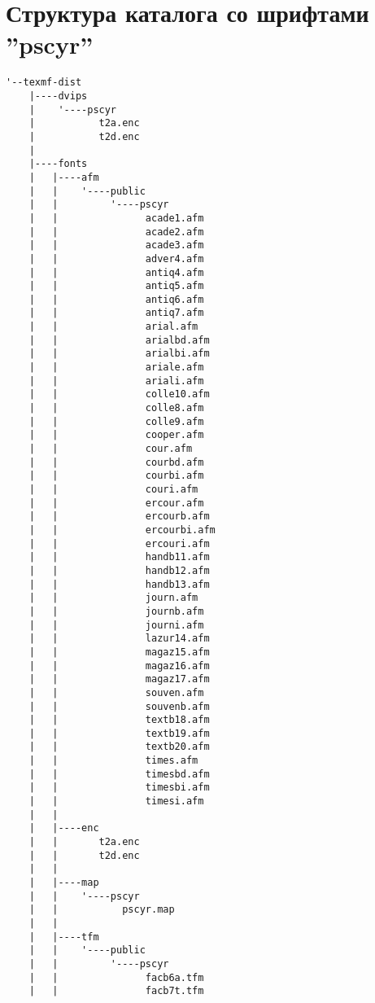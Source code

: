 \section{Структура каталога со шрифтами ''pscyr''} \label{app:list}

\begin{lstlisting}[frame=tb, extendedchars=false, breaklines=false, basicstyle=\footnotesize\upshape ,columns=flexible ,keepspaces=true , lineskip={-7.0pt} ]
 '--texmf-dist
    |----dvips
    |    '----pscyr
    |           t2a.enc
    |           t2d.enc
    |           
    |----fonts
    |   |----afm
    |   |    '----public
    |   |         '----pscyr
    |   |               acade1.afm
    |   |               acade2.afm
    |   |               acade3.afm
    |   |               adver4.afm
    |   |               antiq4.afm
    |   |               antiq5.afm
    |   |               antiq6.afm
    |   |               antiq7.afm
    |   |               arial.afm
    |   |               arialbd.afm
    |   |               arialbi.afm
    |   |               ariale.afm
    |   |               ariali.afm
    |   |               colle10.afm
    |   |               colle8.afm
    |   |               colle9.afm
    |   |               cooper.afm
    |   |               cour.afm
    |   |               courbd.afm
    |   |               courbi.afm
    |   |               couri.afm
    |   |               ercour.afm
    |   |               ercourb.afm
    |   |               ercourbi.afm
    |   |               ercouri.afm
    |   |               handb11.afm
    |   |               handb12.afm
    |   |               handb13.afm
    |   |               journ.afm
    |   |               journb.afm
    |   |               journi.afm
    |   |               lazur14.afm
    |   |               magaz15.afm
    |   |               magaz16.afm
    |   |               magaz17.afm
    |   |               souven.afm
    |   |               souvenb.afm
    |   |               textb18.afm
    |   |               textb19.afm
    |   |               textb20.afm
    |   |               times.afm
    |   |               timesbd.afm
    |   |               timesbi.afm
    |   |               timesi.afm
    |   |               
    |   |----enc
    |   |       t2a.enc
    |   |       t2d.enc
    |   |       
    |   |----map
    |   |    '----pscyr
    |   |           pscyr.map
    |   |           
    |   |----tfm
    |   |    '----public
    |   |         '----pscyr
    |   |               facb6a.tfm
    |   |               facb7t.tfm

\end{lstlisting}
